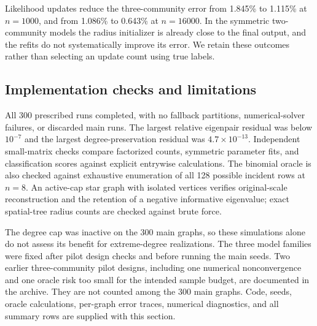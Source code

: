 Likelihood updates reduce the three-community error from 1.845\% to 1.115\% at $n=1000$, and from 1.086\% to 0.643\% at $n=16000$. In the symmetric two-community models the radius initializer is already close to the final output, and the refits do not systematically improve its error. We retain these outcomes rather than selecting an update count using true labels.

\subsection{Implementation checks and limitations}
All 300 prescribed runs completed, with no fallback partitions, numerical-solver failures, or discarded main runs. The largest relative eigenpair residual was below $10^{-7}$ and the largest degree-preservation residual was $4.7\times10^{-13}$. Independent small-matrix checks compare factorized counts, symmetric parameter fits, and classification scores against explicit entrywise calculations. The binomial oracle is also checked against exhaustive enumeration of all 128 possible incident rows at $n=8$. An active-cap star graph with isolated vertices verifies original-scale reconstruction and the retention of a negative informative eigenvalue; exact spatial-tree radius counts are checked against brute force.

The degree cap was inactive on the 300 main graphs, so these simulations alone do not assess its benefit for extreme-degree realizations. The three model families were fixed after pilot design checks and before running the main seeds. Two earlier three-community pilot designs, including one numerical nonconvergence and one oracle risk too small for the intended sample budget, are documented in the archive. They are not counted among the 300 main graphs. Code, seeds, oracle calculations, per-graph error traces, numerical diagnostics, and all summary rows are supplied with this section.
